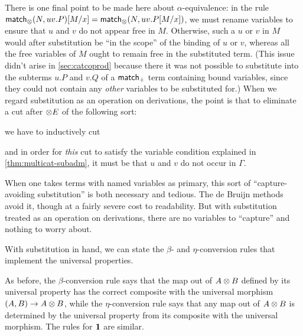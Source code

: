 There is one final point to be made here about $\alpha$-equivalence: in the rule $\match_\tensor(N,uv.P)[M/x] = \match_\tensor(N,uv.P[M/x])$, we must rename variables to ensure that $u$ and $v$ do not appear free in $M$.
Otherwise, such a $u$ or $v$ in $M$ would after substitution be ``in the scope'' of the binding of $u$ or $v$, whereas all the free variables of $M$ ought to remain free in the substituted term.
(This issue didn't arise in \cref{sec:catcoprod} because there it was not possible to substitute into the subterms $u.P$ and $v.Q$ of a $\case$ term containing bound variables, since they could not contain any \emph{other} variables to be substituted for.)
When we regard substitution as an operation on derivations, the point is that to eliminate a cut after $\tensorE$ of the following sort:
\begin{mathpar}
\end{mathpar}
we have to inductively cut
\begin{mathpar}
\end{mathpar}
and in order for \emph{this} cut to satisfy the variable condition explained in \cref{thm:multicat-subadm}, it must be that $u$ and $v$ do not occur in $\Gamma$.

When one takes terms with named variables as primary, this sort of ``capture-avoiding substitution'' is both necessary and tedious.
The de Bruijn methods avoid it, though at a fairly severe cost to readability.
But with substitution treated as an operation on derivations, there are no variables to ``capture'' and nothing to worry about.

With substitution in hand, we can state the $\beta$- and $\eta$-conversion rules that implement the universal properties.
As before, the $\beta$-conversion rule says that the map out of $A\tensor B$ defined by its universal property has the correct composite with the universal morphism $(A,B)\to A\tensor B$, while the $\eta$-conversion rule says that any map out of $A\tensor B$ is determined by the universal property from its composite with the universal morphism.
The rules for $\one$ are similar.

